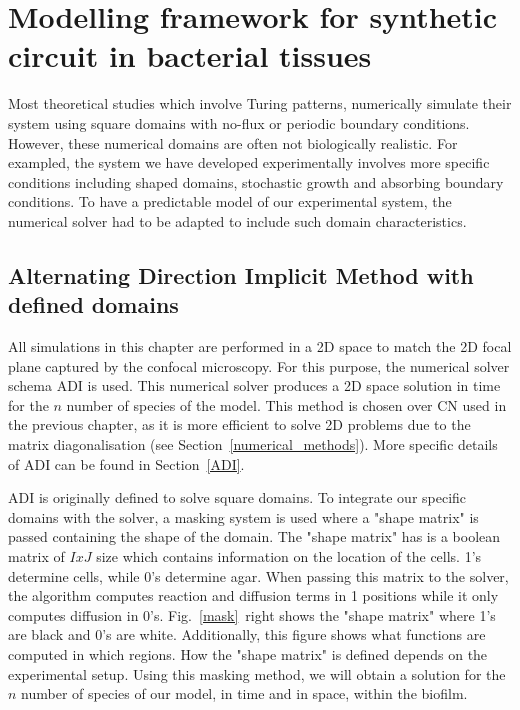 \section{Modelling framework for synthetic circuit in bacterial tissues}
Most theoretical studies which involve Turing patterns, numerically simulate their system using square domains with no-flux or periodic boundary conditions.
However, these numerical domains are often not biologically realistic.
For exampled, the system we have developed experimentally involves more specific conditions including shaped domains, stochastic growth and absorbing boundary conditions.
To have a predictable model of our experimental system, the numerical solver had to be adapted to include such domain characteristics.

\subsection{Alternating Direction Implicit Method with defined domains}\label{Alternating Direction Implicit Method with defined domains}
All simulations in this chapter are performed in a \acrshort{2D} space to match the \acrshort{2D} focal plane captured by the confocal microscopy.
For this purpose, the numerical solver schema  \acrfull{ADI} is used.
This numerical solver produces a 2D space solution in time for the $n$ number of species of the model.
This method is chosen over \acrshort{CN} used in the previous chapter, as it is more efficient to solve 2D problems due to the matrix diagonalisation (see Section~\ref{numerical_methods}). More specific details of ADI can be found in Section~\ref{ADI}.



ADI is originally defined to solve square domains.
To integrate our specific domains with the solver, a masking system is used where a "shape matrix" is passed containing the shape of the domain.
The "shape matrix" has is a boolean matrix of $IxJ$ size which contains information on the location of the cells.
1's determine cells, while 0's determine agar.
When passing this matrix to the solver, the algorithm computes reaction and diffusion terms in 1 positions while it only computes diffusion in 0's.
Fig.~\ref{mask}~right shows the "shape matrix" where 1's are black and 0's are white.
Additionally, this figure shows what functions are computed in which regions.
How the "shape matrix" is defined depends on the experimental setup.
Using this masking method, we will obtain a solution for the $n$ number of species of our model, in time and in space, within the biofilm.

